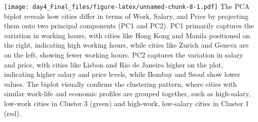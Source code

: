 \documentclass[
]{article}
\newenvironment{Shaded}{\begin{snugshade}}{\end{snugshade}}
\newcommand{\AttributeTok}[1]{\textcolor[rgb]{0.13,0.29,0.53}{#1}}
\newcommand{\CommentTok}[1]{\textcolor[rgb]{0.56,0.35,0.01}{\textit{#1}}}
\newcommand{\DecValTok}[1]{\textcolor[rgb]{0.00,0.00,0.81}{#1}}
\newcommand{\FloatTok}[1]{\textcolor[rgb]{0.00,0.00,0.81}{#1}}
\newcommand{\FunctionTok}[1]{\textcolor[rgb]{0.13,0.29,0.53}{\textbf{#1}}}
\newcommand{\NormalTok}[1]{#1}
\newcommand{\SpecialCharTok}[1]{\textcolor[rgb]{0.81,0.36,0.00}{\textbf{#1}}}
\newcommand{\StringTok}[1]{\textcolor[rgb]{0.31,0.60,0.02}{#1}}
\begin{document}
\begin{Shaded}
\end{Shaded}

\texttt{[image: day4\_Final\_files/figure-latex/unnamed-chunk-8-1.pdf]}
The PCA biplot reveals how cities differ in terms of Work, Salary, and
Price by projecting them onto two principal components (PC1 and PC2).
PC1 primarily captures the variation in working hours, with cities like
Hong Kong and Manila positioned on the right, indicating high working
hours, while cities like Zurich and Geneva are on the left, showing
fewer working hours. PC2 captures the variation in salary and price,
with cities like Lisbon and Rio de Janeiro higher on the plot,
indicating higher salary and price levels, while Bombay and Seoul show
lower values. The biplot visually confirms the clustering pattern, where
cities with similar work-life and economic profiles are grouped
together, such as high-salary, low-work cities in Cluster 3 (green) and
high-work, low-salary cities in Cluster 1 (red).
\end{document}
